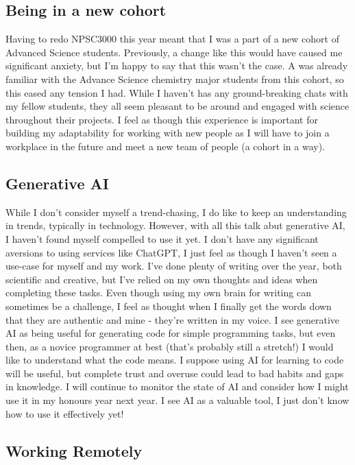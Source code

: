 \documentclass[11pt]{article}
\begin{document}
\subsection{Being in a new cohort}

Having to redo NPSC3000 this year meant that I was a part of a new cohort of Advanced Science students. Previously, a change like this would have caused me significant anxiety, but I'm happy to say that this wasn't the case. A was already familiar with the Advance Science chemistry major students from this cohort, so this eased any tension I had. While I haven't has any ground-breaking chats with my fellow students, they all seem pleasant to be around and engaged with science throughout their projects. I feel as though this experience is important for building my adaptability for working with new people as I will have to join a workplace in the future and meet a new team of people (a cohort in a way).

\subsection{Generative AI}

While I don't consider myself a trend-chasing, I do like to keep an understanding in trends, typically in technology. However, with all this talk abut generative AI, I haven't found myself compelled to use it yet. I don't have any significant aversions to using services like ChatGPT, I just feel as though I haven't seen a use-case for myself and my work. I've done plenty of writing over the year, both scientific and creative, but I've relied on my own thoughts and ideas when completing these tasks. Even though using my own brain for writing can sometimes be a challenge, I feel as thought when I finally get the words down that they are authentic and mine - they're written in my voice. I see generative AI as being useful for generating code for simple programming tasks, but even then, as a novice programmer at best (that's probably still a stretch!) I would like to understand what the code means. I suppose using AI for learning to code will be useful, but complete trust and overuse could lead to bad habits and gaps in knowledge. I will continue to monitor the state of AI and consider how I might use it in my honours year next year. I see AI as a valuable tool, I just don't know how to use it effectively yet!

\subsection{Working Remotely}
\end{document}
